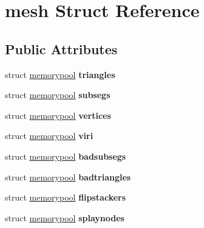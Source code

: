 \hypertarget{structmesh}{
\section{mesh Struct Reference}
\label{structmesh}
}
\subsection*{Public Attributes}
\begin{DoxyCompactItemize}
\item 
\hypertarget{structmesh_a69079626a8de35998ff5ee644aeb5b5a}{
struct \hyperlink{structmemorypool}{memorypool} {\bfseries triangles}}
\label{structmesh_a69079626a8de35998ff5ee644aeb5b5a}

\item 
\hypertarget{structmesh_a3c29f7e745ae22b5bb4cf08d49b77895}{
struct \hyperlink{structmemorypool}{memorypool} {\bfseries subsegs}}
\label{structmesh_a3c29f7e745ae22b5bb4cf08d49b77895}

\item 
\hypertarget{structmesh_a9812ee57bbbb5b168d4a85403e5acbad}{
struct \hyperlink{structmemorypool}{memorypool} {\bfseries vertices}}
\label{structmesh_a9812ee57bbbb5b168d4a85403e5acbad}

\item 
\hypertarget{structmesh_a3cb8300dd2e6dc4e11795ac178bf02b5}{
struct \hyperlink{structmemorypool}{memorypool} {\bfseries viri}}
\label{structmesh_a3cb8300dd2e6dc4e11795ac178bf02b5}

\item 
\hypertarget{structmesh_aeb8da45b7822882ee7db7d1a1249a0b7}{
struct \hyperlink{structmemorypool}{memorypool} {\bfseries badsubsegs}}
\label{structmesh_aeb8da45b7822882ee7db7d1a1249a0b7}

\item 
\hypertarget{structmesh_a05cf8b5d0015464c86521cd8a1ddd768}{
struct \hyperlink{structmemorypool}{memorypool} {\bfseries badtriangles}}
\label{structmesh_a05cf8b5d0015464c86521cd8a1ddd768}

\item 
\hypertarget{structmesh_a21056ea10e510d8aaa99e93d35ef5fe2}{
struct \hyperlink{structmemorypool}{memorypool} {\bfseries flipstackers}}
\label{structmesh_a21056ea10e510d8aaa99e93d35ef5fe2}

\item 
\hypertarget{structmesh_a86186d96a9bac08ba51665bce57a4009}{
struct \hyperlink{structmemorypool}{memorypool} {\bfseries splaynodes}}
\label{structmesh_a86186d96a9bac08ba51665bce57a4009}


\end{DoxyCompactItemize}
